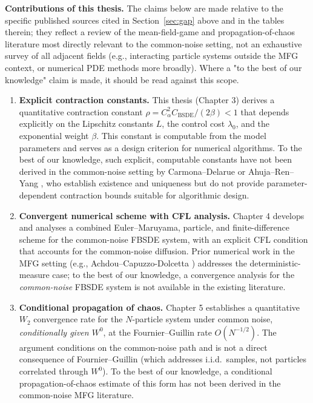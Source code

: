 \bigskip
\noindent\textbf{Contributions of this thesis.} The claims below are made
relative to the specific published sources cited in Section~\ref{sec:gap} above
and in the tables therein; they reflect a review of the mean-field-game and
propagation-of-chaos literature most directly relevant to the common-noise
setting, not an exhaustive survey of all adjacent fields (e.g., interacting
particle systems outside the MFG context, or numerical PDE methods more
broadly). Where a "to the best of our knowledge" claim is made, it should be
read against this scope.

\begin{enumerate}
    \item \textbf{Explicit contraction constants.} This thesis (Chapter 3)
    derives a quantitative contraction constant $\rho = C_\alpha^2 C_{\mathrm{BSDE}}
    / (2\beta) < 1$ that depends explicitly on the Lipschitz constants $L$,
    the control cost $\lambda_0$, and the exponential weight $\beta$. This constant
    is computable from the model parameters and serves as a design criterion for
    numerical algorithms. To the best of our knowledge, such explicit, computable
    constants have not been derived in the common-noise setting by
    Carmona--Delarue \citep{carmonadelarue2018} or Ahuja--Ren--Yang
    \citep{ahujarenyang2019}, who establish existence and uniqueness but do not
    provide parameter-dependent contraction bounds suitable for algorithmic design.

    \item \textbf{Convergent numerical scheme with CFL analysis.} Chapter 4
    develops and analyses a combined Euler--Maruyama, particle, and
    finite-difference scheme for the common-noise FBSDE
    system, with an explicit CFL condition that accounts for the common-noise
    diffusion. Prior numerical work in the MFG setting (e.g., Achdou--Capuzzo-Dolcetta
    \citep{achdoucapuzzo2010}) addresses the deterministic-measure case; to the best
    of our knowledge, a convergence analysis for the \emph{common-noise} FBSDE
    system is not available in the existing literature.

    \item \textbf{Conditional propagation of chaos.} Chapter 5 establishes a
    quantitative $W_2$ convergence rate for the $N$-particle system under
    common noise, \emph{conditionally given $W^0$}, at the Fournier--Guillin
    rate $O(N^{-1/2})$. The argument conditions on the common-noise path and
    is not a direct consequence of Fournier--Guillin \citep{fournierguillin2015}
    (which addresses i.i.d.\ samples, not particles correlated through $W^0$).
    To the best of our knowledge, a conditional propagation-of-chaos estimate
    of this form has not been derived in the common-noise MFG literature.


\end{enumerate}
